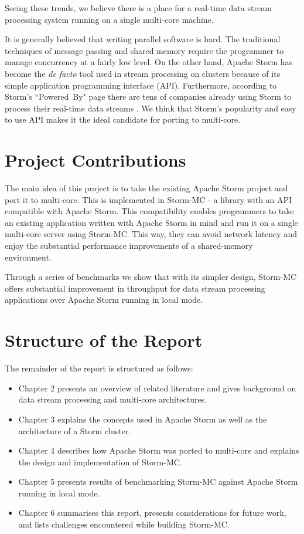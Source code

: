 \documentclass[bsc,deptreport,twoside,singlespacing,normalheadings,parskip]{infthesis}\usepackage[]{graphicx}\usepackage[]{color}
\begin{document}
Seeing these trends, we believe there is a place for a real-time data stream processing system running on a single multi-core machine.

It is generally believed that writing parallel software is hard. The traditional techniques of message passing and shared memory require the programmer to manage concurrency at a fairly low level. On the other hand, Apache Storm has become the \textit{de facto} tool used in stream processing on clusters because of its simple application programming interface (API). Furthermore, according to Storm's ``Powered~By" page there are tens of companies already using Storm to process their real-time data streams \cite{PoweredBy}. We think that Storm's popularity and easy to use API makes it the ideal candidate for porting to multi-core.

\section{Project Contributions}

The main idea of this project is to take the existing Apache Storm project and port it to multi-core. This is implemented in Storm-MC - a library with an API compatible with Apache Storm. This compatibility enables programmers to take an existing application written with Apache Storm in mind and run it on a single multi-core server using Storm-MC. This way, they can avoid network latency and enjoy the substantial performance improvements of a shared-memory environment.

Through a series of benchmarks we show that with its simpler design, Storm-MC offers substantial improvement in throughput for data stream processing applications over Apache Storm running in local mode.

\section{Structure of the Report}

The remainder of the report is structured as follows:

\begin{itemize}
	\item Chapter 2 presents an overview of related literature and gives background on data stream processing and multi-core architectures.
	\item Chapter 3 explains the concepts used in Apache Storm as well as the architecture of a Storm cluster.
	\item Chapter 4 describes how Apache Storm was ported to multi-core and explains the design and implementation of Storm-MC.
	\item Chapter 5 presents results of benchmarking Storm-MC against Apache Storm running in local mode.
	\item Chapter 6 summarises this report, presents considerations for future work, and lists challenges encountered while building Storm-MC.
\end{itemize}
\clearpage{}
\end{document}
